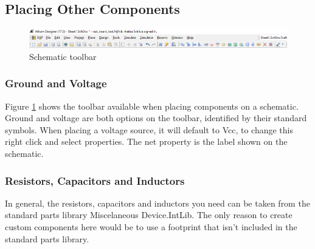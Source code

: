\documentclass{report}
\begin{document}
	\subsection{Placing Other Components}
	\begin{figure}[H]	
		\centering
		\includegraphics[width=16cm]{pics/schematic_toolbar.png}
		\caption{Schematic toolbar}
		\label{fig 10}
	\end{figure}
	\subsubsection{Ground and Voltage}
	Figure \ref{fig 10} shows the toolbar available when placing components on a schematic. Ground and voltage are both options on the toolbar, identified by their standard symbols. When placing a voltage source, it will default to Vcc, to change this right click and select properties. The net property is the label shown on the schematic.
	\subsubsection{Resistors, Capacitors and Inductors}
	In general, the resistors, capacitors and inductors you need can be taken from the standard parts library Miscelaneous Device.IntLib. The only reason to create custom components here would be to use a footprint that isn't included in the standard parts library.
\end{document}
